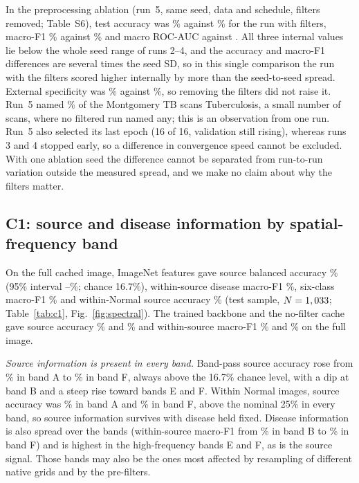 In the preprocessing ablation (run~5, same seed, data and schedule, filters removed; Table~S6), test accuracy was \RAblTestAcc\% against \RMSRunOneTestAcc\% for the run with filters, macro-F1 \RAblTestMacroFOne\% against \RMSRunOneTestMacroFOne\% and macro ROC-AUC \RAblTestMacroAUC{} against \RMSRunOneTestMacroAUC. All three internal values lie below the whole seed range of runs 2--4, and the accuracy and macro-F1 differences are several times the seed SD, so in this single comparison the run with the filters scored higher internally by more than the seed-to-seed spread. External specificity was \RAblExtSpec\% against \RMSRunOneExtSpec\%, so removing the filters did not raise it. Run~5 named \RAblExtTB\% of the Montgomery TB scans Tuberculosis, a small number of scans, where no filtered run named any; this is an observation from one run. Run~5 also selected its last epoch (16 of 16, validation still rising), whereas runs 3 and 4 stopped early, so a difference in convergence speed cannot be excluded. With one ablation seed the difference cannot be separated from run-to-run variation outside the measured spread, and we make no claim about why the filters matter.

\subsection{C1: source and disease information by spatial-frequency band}
\label{sec:res-c1}
On the full cached image, ImageNet features gave source balanced accuracy \RSpecMainTestFullSrcBA\% (95\% interval \RSpecMainTestFullSrcBALo--\RSpecMainTestFullSrcBAHi\%; chance 16.7\%), within-source disease macro-F1 \RSpecMainTestFullFWs\%, six-class macro-F1 \RSpecMainTestFullFAll\% and within-Normal source accuracy \RSpecMainTestFullNormBA\% (test sample, $N=1,033$; Table~\ref{tab:c1}, Fig.~\ref{fig:spectral}). The trained backbone and the no-filter cache gave source accuracy \RSpecServedTestFullSrcBA\% and \RSpecNofilterTestFullSrcBA\% and within-source macro-F1 \RSpecServedTestFullFWs\% and \RSpecNofilterTestFullFWs\% on the full image.

\textit{Source information is present in every band.} Band-pass source accuracy rose from \RSpecMainTestPassASrcBA\% in band A to \RSpecMainTestPassFSrcBA\% in band F, always above the 16.7\% chance level, with a dip at band B and a steep rise toward bands E and F. Within Normal images, source accuracy was \RSpecMainTestPassANormBA\% in band A and \RSpecMainTestPassFNormBA\% in band F, above the nominal 25\% in every band, so source information survives with disease held fixed. Disease information is also spread over the bands (within-source macro-F1 from \RSpecMainTestPassBFWs\% in band B to \RSpecMainTestPassFFWs\% in band F) and is highest in the high-frequency bands E and F, as is the source signal. Those bands may also be the ones most affected by resampling of different native grids and by the pre-filters.

